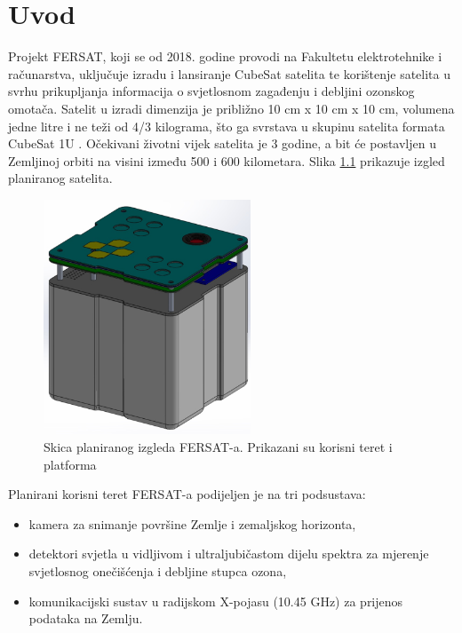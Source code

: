 \chapter{Uvod}
    Projekt FERSAT, koji se od 2018. godine provodi na Fakultetu elektrotehnike i računarstva, uključuje izradu i lansiranje CubeSat satelita te korištenje satelita u svrhu prikupljanja informacija o svjetlosnom zagađenju i debljini ozonskog omotača. Satelit u izradi dimenzija je približno 10 cm x 10 cm x 10 cm, volumena jedne litre i ne teži od 4/3 kilograma, što ga svrstava u skupinu satelita formata CubeSat 1U \cite{fersat_stranica_projekta}. Očekivani životni vijek satelita je 3 godine, a bit će postavljen u Zemljinoj orbiti na visini između 500 i 600 kilometara. Slika \ref{fig:fersat} prikazuje izgled planiranog satelita.
    
    \begin{figure}[htb]
        \centering
        \includegraphics[height=7cm]{slike/fersat.png}
        \caption{Skica planiranog izgleda FERSAT-a. Prikazani su korisni teret  i platforma  \cite{fersat_stranica_projekta}}
        \label{fig:fersat}
    \end{figure}
    
    Planirani korisni teret  FERSAT-a podijeljen je na tri podsustava:

    \begin{itemize}
        \item kamera za snimanje površine Zemlje i zemaljskog horizonta,
        \item detektori svjetla u vidljivom i ultraljubičastom dijelu spektra za mjerenje svjetlosnog onečišćenja i debljine stupca ozona,
        \item komunikacijski sustav u radijskom X-pojasu (10.45 GHz) za prijenos podataka na Zemlju.
    \end{itemize}

